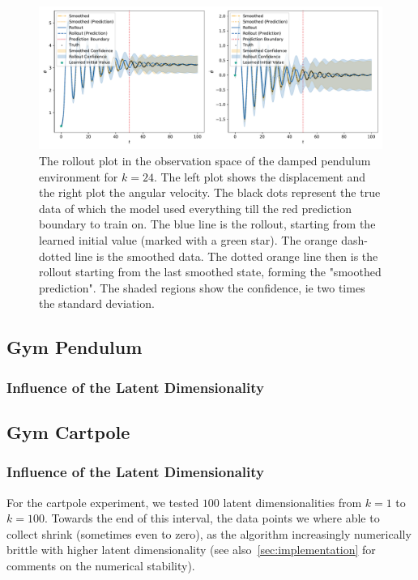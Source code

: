 			\begin{figure}
				\centering
				\includegraphics[width=\linewidth]{figures/results/pendulum-damped/run-latent-dim-24/rollout-observations-N0.pdf}
				\caption{The rollout plot in the observation space of the damped pendulum environment for \(k = 24\). The left plot shows the displacement and the right plot the angular velocity. The black dots represent the true data of which the model used everything till the red prediction boundary to train on. The blue line is the rollout, starting from the learned initial value (marked with a green star). The orange dash-dotted line is the smoothed data. The dotted orange line then is the rollout starting from the last smoothed state, forming the "smoothed prediction". The shaded regions show the confidence, \ac{ie} two times the standard deviation.}
				\label{fig:pendulumDampedRolloutL24}
			\end{figure}

	\subsection{Gym Pendulum}

		\subsubsection{Influence of the Latent Dimensionality}


	\subsection{Gym Cartpole}

		\subsubsection{Influence of the Latent Dimensionality}
			For the cartpole experiment, we tested \(100\) latent dimensionalities from \( k = 1 \) to \( k = 100 \). Towards the end of this interval, the data points we where able to collect shrink (sometimes even to zero), as the algorithm increasingly numerically brittle with higher latent dimensionality (see also~\autoref{sec:implementation} for comments on the numerical stability).

